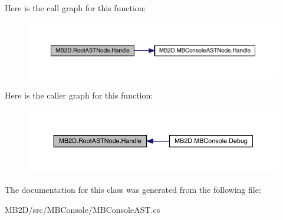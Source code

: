 Here is the call graph for this function\+:
\nopagebreak
\begin{figure}[H]
\begin{center}
\leavevmode
\includegraphics[width=350pt]{class_m_b2_d_1_1_root_a_s_t_node_a16290285c34db0660c0a8006fa182d0d_cgraph}
\end{center}
\end{figure}
Here is the caller graph for this function\+:
\nopagebreak
\begin{figure}[H]
\begin{center}
\leavevmode
\includegraphics[width=350pt]{class_m_b2_d_1_1_root_a_s_t_node_a16290285c34db0660c0a8006fa182d0d_icgraph}
\end{center}
\end{figure}


The documentation for this class was generated from the following file\+:\begin{DoxyCompactItemize}
\item 
M\+B2\+D/src/\+M\+B\+Console/M\+B\+Console\+A\+S\+T.\+cs\end{DoxyCompactItemize}
